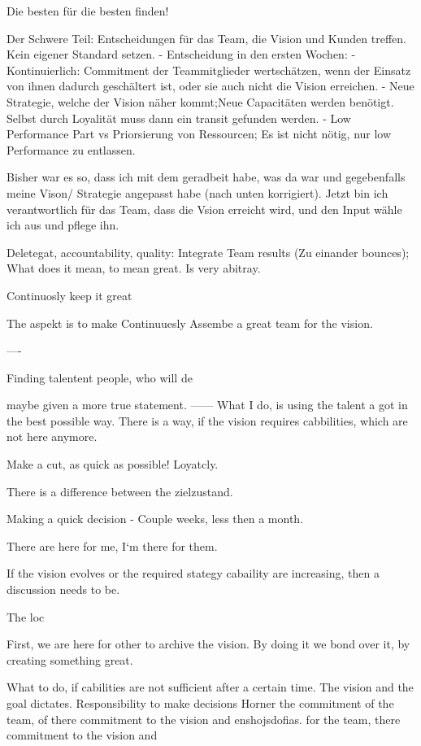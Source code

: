 Die besten für die besten finden!


Der Schwere Teil: Entscheidungen für das Team, die Vision und Kunden treffen. Kein eigener Standard setzen.
- Entscheidung in den ersten Wochen: 
- Kontinuierlich: Commitment der Teammitglieder wertschätzen, wenn der Einsatz von ihnen dadurch geschältert ist, oder sie auch nicht die Vision erreichen.
- Neue Strategie, welche der Vision näher kommt;Neue Capacitäten werden benötigt. Selbst durch Loyalität muss dann ein transit gefunden werden.
- Low Performance Part vs Priorsierung von Ressourcen; Es ist nicht nötig, nur low Performance zu entlassen.

Bisher war es so, dass ich mit dem geradbeit habe, was da war und gegebenfalls meine Vison/ Strategie angepasst habe (nach unten korrigiert).
Jetzt bin ich verantwortlich für das Team, dass die Vsion erreicht wird, und den Input wähle ich aus und pflege ihn.

Deletegat, accountability, quality: Integrate Team results (Zu einander bounces); 
What does it mean, to mean great. Is very abitray.


Continuosly keep it great

The aspekt is to make Continuuesly Assembe a great team for the vision.

—-






Finding talentent people, who will de

maybe given a more true statement.
——
What I do, is using the talent a got in the best possible way. 
There is a way, if the vision requires cabbilities, which are not here anymore.

Make a cut, as quick as possible!
Loyatcly. 

There is a difference between the zielzustand.

Making a quick decision - Couple weeks, less then a month.

There are here for me, I‘m there for them.

If the vision evolves or the required stategy cabaility are increasing, then a discussion needs to be.


The loc

First, we are here for other to archive the vision. By doing it we bond over it, by creating something great.

What to do, if cabilities are not sufficient after a certain time. 
The vision and the goal dictates.
Responsibility to make decisions 
Horner the commitment of the team, of there commitment to the vision and enshojsdofias.
for the team, there commitment to the vision and 

